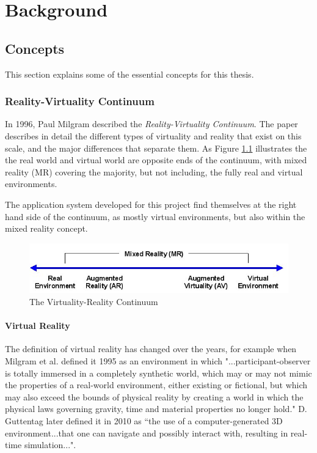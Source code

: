 
\chapter{Background}
\label{chap:background}



\section{Concepts}
This section explains some of the essential concepts for this thesis.


\subsection{Reality-Virtuality Continuum} \label{background:Continuum}
In 1996, Paul Milgram described the \textit{Reality-Virtuality Continuum}\cite{milgram1995augmented}. The paper describes in detail the different types of virtuality and reality that exist on this scale, and the major differences that separate them. As Figure \ref{fig:VR_continuum} illustrates the the real world and virtual world are opposite ends of the continuum, with mixed reality (MR) covering the majority, but not including, the fully real and virtual environments. 

The application system developed for this project find themselves at the right hand side of the continuum, as mostly virtual environments, but also within the mixed reality concept.  

\begin{figure}
    \centering
    \includegraphics[width=\textwidth]{./fig/background/Virtuality_Continuum_2}
    \caption{The Virtuality-Reality Continuum}
    \label{fig:VR_continuum}
\end{figure}


\subsubsection{Virtual Reality}
The definition of virtual reality has changed over the years, for example when Milgram et al. defined it 1995 \cite{milgram1995augmented} as an environment in which "...participant-observer is totally immersed in a completely synthetic world, which may or may not mimic the properties of a real-world environment, either existing or fictional, but which may also exceed the bounds of physical reality by creating a world in which the physical laws governing gravity, time and material properties no longer hold." D. Guttentag \cite{guttentag2010virtual} later defined it in 2010 as “the use of a computer-generated 3D environment...that one can navigate and possibly interact with, resulting in real-time simulation...".


